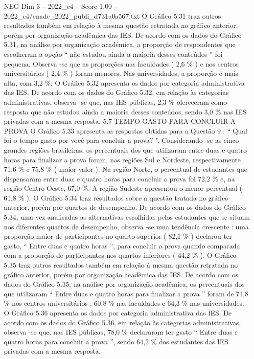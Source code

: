 \begin{textsample}{NEG Dim 3 – 2022\_c4 – Score 1.00 – 2022\_c4/enade\_2022\_publi\_d731a0a567.txt}
O Gráfico 5.31 traz outros resultados também em relação à mesma questão retratada no gráfico anterior, porém por organização acadêmica das IES.
De acordo com os dados do Gráfico 5.31, na análise por organização acadêmica, a proporção de respondentes que escolheram a opção “ não estudou ainda a maioria desses conteúdos ” foi pequena.
Observa -se que as proporções nas faculdades ( 2,6 \% ) e nos centros universitários ( 2,4 \% ) foram menores.
Nas universidades, a proporção é mais alta, com 3,2 \%.
O Gráfico 5.32 apresenta os dados por categoria administrativa das IES.
De acordo com os dados do Gráfico 5.32, em relação às categorias administrativas, observa -se que, nas IES públicas, 2,3 \% ofereceram como resposta que não estudou ainda a maioria desses conteúdos, sendo 3,0 \% nas IES privadas com a mesma resposta. 5.7 TEMPO GASTO PARA CONCLUIR A PROVA O Gráfico 5.33 apresenta as respostas obtidas para a Questão 9 : “ Qual foi o tempo gasto por você para concluir a prova? ”.
Considerando -se as cinco grandes regiões brasileiras, os percentuais dos que utilizaram entre duas e quatro horas para finalizar a prova foram, nas regiões Sul e Nordeste, respectivamente 71,6 \% e 75,8 \% ( maior valor ).
Na região Norte, o percentual de estudantes que dispensaram entre duas e quatro horas para concluir a prova foi 72,2 \% e, na região Centro-Oeste, 67,0 \%.
A região Sudeste apresentou o menor percentual ( 61,8 \% ).
O Gráfico 5.34 traz resultados sobre a questão tratada no gráfico anterior, porém por quartos de desempenho.
De acordo com os dados do Gráfico 5.34, uma vez analisadas as alternativas escolhidas pelos estudantes que se situam nos diferentes quartos de desempenho, observa -se uma tendência crescente : uma proporção maior de participantes no quarto superior ( 82,1 \% ) declarou ter gasto, “ Entre duas e quatro horas ”, para concluir a prova quando comparada com a proporção de participantes nos quartos inferiores ( 44,2 \% ).
O Gráfico 5.35 traz outros resultados também em relação à mesma questão retratada no gráfico anterior, porém por organização acadêmica das IES.
De acordo com os dados do Gráfico 5.35, na análise por organização acadêmica, os percentuais dos que utilizaram “ Entre duas e quatro horas para finalizar a prova ” foram de 71,8 \% nos centros-universitários ; 60,8 \% nas faculdades e 64,3 \% nas universidades.
O Gráfico 5.36 apresenta os dados por categoria administrativa das IES.
De acordo com os dados do Gráfico 5.36, em relação às categorias administrativas, observa -se que, nas IES públicas, 78,0 \% declararam ter gasto “ Entre duas e quatro horas para concluir a prova ”, sendo 64,2 \% dos estudantes das IES privadas com a mesma resposta.

\end{textsample}
